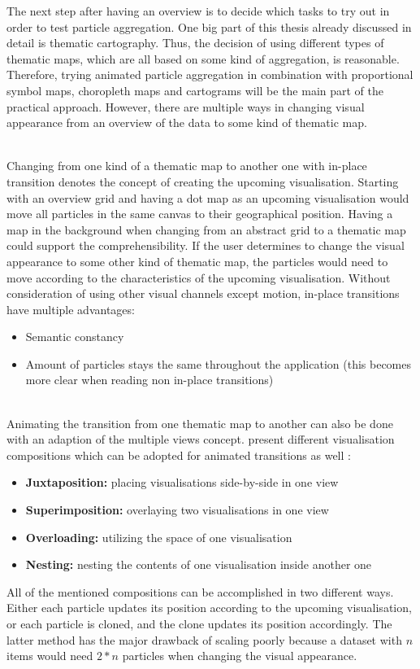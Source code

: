 The next step after having an overview is to decide which tasks to try out in order to test particle aggregation. One big part of this thesis already discussed in detail is thematic cartography. Thus, the decision of using different types of thematic maps, which are all based on some kind of aggregation, is reasonable. Therefore, trying animated particle aggregation in combination with proportional symbol maps, choropleth maps and cartograms will be the main part of the practical approach. However, there are multiple ways in changing visual appearance from an overview of the data to some kind of thematic map.

\begin{enumerate}

 \hfill \\
Changing from one kind of a thematic map to another one with in-place transition denotes the concept of creating the upcoming visualisation. Starting with an overview grid and having a dot map as an upcoming visualisation would move all particles in the same canvas to their geographical position. Having a map in the background when changing from an abstract grid to a thematic map could support the comprehensibility.
If the user determines to change the visual appearance to some other kind of thematic map, the particles would need to move according to the characteristics of the upcoming visualisation. Without consideration of using other visual channels except motion, in-place transitions have multiple advantages:
\begin{itemize}
\item Semantic constancy
\item Amount of particles stays the same throughout the application (this becomes more clear when reading non in-place transitions)
\end{itemize}

 \hfill \\
Animating the transition from one thematic map to another can also be done with an adaption of the multiple views concept. \citeauthor{Javed2012} present different visualisation compositions which can be adopted for animated transitions as well :
\begin{itemize}
\item \textbf{Juxtaposition:} placing visualisations side-by-side in one view
\item \textbf{Superimposition:} overlaying two visualisations in one view
\item \textbf{Overloading:} utilizing the space of one visualisation
\item \textbf{Nesting:} nesting the contents of one visualisation inside another one
\end{itemize}

All of the mentioned compositions can be accomplished in two different ways. Either each particle updates its position according to the upcoming visualisation, or each particle is cloned, and the clone updates its position accordingly. The latter method has the major drawback of scaling poorly because a dataset with $n$ items would need $2*n$ particles when changing the visual appearance.
\end{enumerate}

